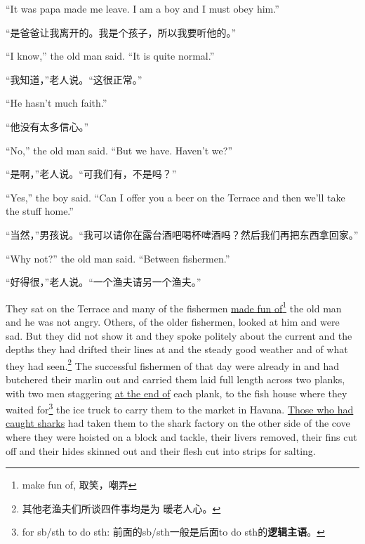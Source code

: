 \begin{paracol}{2}
\switchcolumn*

``It was papa made me leave. I am a boy and I must \gls{obey} him.''

\switchcolumn

“是爸爸让我离开的。我是个孩子，所以我要听他的。”

\switchcolumn*

``I know,'' the old man said. ``It is quite normal.''

\switchcolumn

“我知道，”老人说。“这很正常。”

\switchcolumn*

``He hasn't much \gls{faith}.''

\switchcolumn

“他没有太多信心。”

\switchcolumn*

``No,'' the old man said. ``But we have. Haven't we?''

\switchcolumn

“是啊，”老人说。“可我们有，不是吗？”

\switchcolumn*

``Yes,'' the boy said. ``Can I offer you a beer on the \gls{Terrace} and then we'll take the \gls{stuff} home.''

\switchcolumn

“当然，”男孩说。“我可以请你在露台酒吧喝杯啤酒吗？然后我们再把东西拿回家。”

\switchcolumn*

``Why not?'' the old man said. ``Between fishermen.''

\switchcolumn

“好得很，”老人说。“一个渔夫请另一个渔夫。”

\switchcolumn*

They sat on the Terrace and many of the fishermen \uline{made fun
  of}\footnote{make fun of, 取笑，嘲弄} the old man and he was not angry.
Others, of the older fishermen, looked at him and were sad. But they did not
show it and they spoke \gls{politely} about the \gls{current} and the
\glspl{depth} they had \gls{drifted} their lines at and the \gls{steady}
good weather and of what they had seen.\footnote{其他老渔夫们所谈四件事均是为
  暖老人心。} The successful fishermen of that day were already in and had
\gls{butchered} their \gls{marlin} out and carried them \gls{laid} full
length across two \glspl{plank}, with two men \gls{staggering} \uline{at the
  end of} each plank, to the fish house where they waited for\footnote{for
  sb/sth to do sth: 前面的sb/sth一般是后面to do sth的\textbf{逻辑主语}。} the
ice truck to carry them to the market in Havana. \uline{Those who had caught
  \glspl{shark}} had taken them to the shark factory on the other side of
the \gls{cove} where they were \gls{hoisted} on a \gls{block} and
\gls{tackle}, their \glspl{liver} removed, their \glspl{fin} cut off and
their \glspl{hide} \gls{skinned} out and their \gls{flesh} cut into
\glspl{strip} for salting.


\end{paracol}
